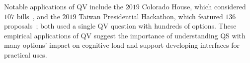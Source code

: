 Notable applications of QV include the $2019$ Colorado House, which considered $107$ bills~\cite{coyNewWayVoting2019}, and the $2019$ Taiwan Presidential Hackathon, which featured $136$ proposals~\cite{QuadraticVotingFrontend2022}; both used a single QV question with hundreds of options. These empirical applications of QV suggest the importance of understanding QS with many options' impact on cognitive load and support developing interfaces for practical uses.